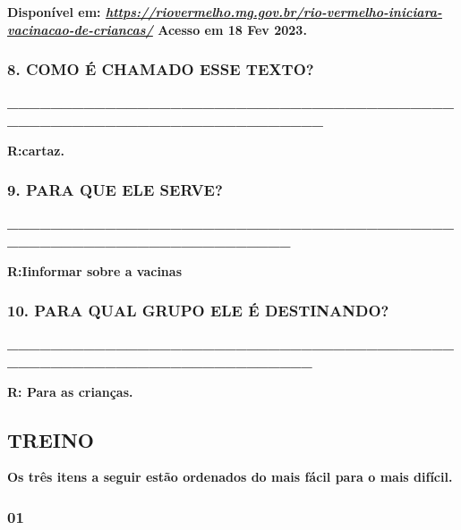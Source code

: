 \textbf{Disponível em:
\href{https://riovermelho.mg.gov.br/rio-vermelho-iniciara-vacinacao-de-criancas/}{\emph{https://riovermelho.mg.gov.br/rio-vermelho-iniciara-vacinacao-de-criancas/}}
Acesso em 18 Fev 2023.}

\subsubsection{8. COMO É CHAMADO ESSE
TEXTO?}\label{como-uxe9-chamado-esse-texto}

\textbf{\_\_\_\_\_\_\_\_\_\_\_\_\_\_\_\_\_\_\_\_\_\_\_\_\_\_\_\_\_\_\_\_\_\_\_\_\_\_\_\_\_\_\_\_\_\_\_\_\_\_\_\_\_\_\_\_\_\_\_\_\_\_\_\_\_\_\_\_\_\_}

\textbf{R:cartaz.}\protect\hypertarget{_heading=h.jmn0osvpcycz}{}{\protect\hypertarget{_heading=h.7rmterfq7uhk}{}{}}

\subsubsection{9. PARA QUE ELE SERVE?}\label{para-que-ele-serve}

\textbf{\_\_\_\_\_\_\_\_\_\_\_\_\_\_\_\_\_\_\_\_\_\_\_\_\_\_\_\_\_\_\_\_\_\_\_\_\_\_\_\_\_\_\_\_\_\_\_\_\_\_\_\_\_\_\_\_\_\_\_\_\_\_\_\_\_\_\_}

\textbf{R:Iinformar sobre a
vacinas}\protect\hypertarget{_heading=h.v322bx8tzcgo}{}{}

\subsubsection{10. PARA QUAL GRUPO ELE É
DESTINANDO?}\label{para-qual-grupo-ele-uxe9-destinando}

\textbf{\_\_\_\_\_\_\_\_\_\_\_\_\_\_\_\_\_\_\_\_\_\_\_\_\_\_\_\_\_\_\_\_\_\_\_\_\_\_\_\_\_\_\_\_\_\_\_\_\_\_\_\_\_\_\_\_\_\_\_\_\_\_\_\_\_\_\_\_\_}

\textbf{R: Para as crianças.}

\subsection{TREINO}\label{treino-3}

\textbf{Os três itens a seguir estão ordenados do mais fácil para o mais
difícil. }

\subsubsection{01 }\label{section-12}

